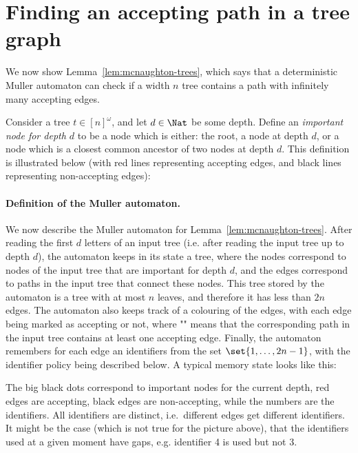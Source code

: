 \section{Finding an accepting path in a tree graph}
\label{sec:dag-graphs}
We now show Lemma~\ref{lem:mcnaughton-trees}, which says that a deterministic Muller automaton can check if a width $n$ tree contains a path with infinitely many accepting edges.

Consider a tree $t \in [n]^\omega$, and let $d \in \Nat$ be some depth. Define an  \emph{important node for depth $d$} to be a node which is either: the root, a node at depth $d$, or a node which is a closest common ancestor of two nodes at depth $d$. This definition is illustrated below (with red lines representing accepting edges, and black lines representing non-accepting edges):






\paragraph*{Definition of the Muller automaton.} We now describe the Muller automaton for Lemma~\ref{lem:mcnaughton-trees}. After reading the first $d$ letters of an input tree (i.e. after reading the input tree up to depth $d$), the automaton keeps in its state a tree, where the nodes correspond to nodes of the input tree that are important for depth $d$, and the edges correspond to paths in the input tree that connect these nodes. This tree stored by the automaton is a tree with at most $n$ leaves, and therefore it has less than $2n$ edges. The automaton also keeps track of a colouring of the edges, with each edge being marked as accepting or not, where "" means that the corresponding path in the input tree contains at least one accepting edge. Finally, the automaton remembers for each edge an identifiers from the set $\set{1,\ldots,2n-1}$, with the identifier policy being described below. A typical memory state looks like this:


The big black dots correspond to important nodes for the current depth, red edges are accepting, black edges are non-accepting, while the numbers are the identifiers. All identifiers are distinct, i.e.~different edges get different identifiers. It might be the case (which is not true for the picture above), that the identifiers used at a given moment have gaps, e.g. identifier 4 is used but not 3.

